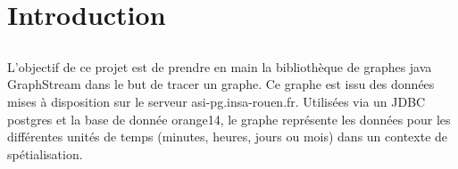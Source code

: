\chapter{Introduction}

\section*{}
L'objectif de ce projet est de prendre en main la bibliothèque de graphes java GraphStream dans le but de tracer un graphe. Ce graphe est issu des données mises à disposition sur le serveur asi-pg.insa-rouen.fr. Utilisées via un JDBC postgres et la base de donnée orange14, le graphe représente les données pour les différentes unités de temps (minutes, heures, jours ou mois) dans un contexte de spétialisation.
\section*{}
